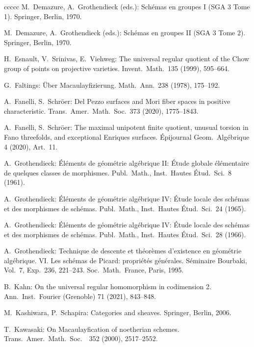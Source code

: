 \documentclass[oneside, 12pt]{amsart}
\theoremstyle{definition}
\theoremstyle{remark}
\begin{document}
\begin{thebibliography}{ccccc}
M.\ Demazure, A.\ Grothendieck (eds.):
Sch\'emas en groupes I (SGA 3 Tome 1).
Springer, Berlin, 1970.

M.\ Demazure, A.\ Grothendieck (eds.):
Sch\'emas en groupes II (SGA 3 Tome 2).
Springer, Berlin, 1970.

H.\ Esnault, V.\ Srinivas, E.\  Viehweg:
The universal regular quotient of the Chow group of points on projective varieties. 
Invent.\ Math.\ 135 (1999), 595--664.

G.\ Faltings:
\"Uber Macaulayfizierung. 
Math.\ Ann.\ 238 (1978),  175--192. 

A.\ Fanelli, S.\ Schr\"oer:
Del Pezzo surfaces and Mori fiber spaces in positive characteristic.
Trans.\ Amer.\ Math.\ Soc.\  373 (2020),  1775--1843.

A.\ Fanelli, S.\ Schr\"oer:
The maximal unipotent finite quotient, unusual torsion in Fano threefolds, and exceptional Enriques surfaces.
\'Epijournal Geom.\ Alg\'ebrique  4 (2020), Art.\ 11.

A.\ Grothendieck:
\'El\'ements de g\'eom\'etrie alg\'ebrique II:
\'Etude globale \'el\'ementaire de quelques classes de morphismes.
Publ.\ Math., Inst.\ Hautes \'Etud.\ Sci.\ 8 (1961).

A.\ Grothendieck:
\'El\'ements de g\'eom\'etrie alg\'ebrique IV: \'Etude locale des
sch\'emas et des morphismes de sch\'emas.
Publ.\ Math., Inst.\ Hautes \'Etud.\ Sci.\   24 (1965).

A.\ Grothendieck:
\'El\'ements de g\'eom\'etrie alg\'ebrique IV: \'Etude locale des
sch\'emas et des morphismes de sch\'emas.
Publ.\ Math., Inst.\ Hautes \'Etud.\ Sci.\  28 (1966).

A.\ Grothendieck:
Technique de descente et th\'eor\`emes d'existence en g\'eom\'etrie alg\'ebrique. VI. 
Les sch\'emas de Picard: propri\'et\'es g\'en\'erales. 
S\'eminaire Bourbaki, Vol.\ 7, Exp.\ 236, 221--243.
Soc.\ Math.\ France, Paris, 1995. 

B.\ Kahn:
On the universal regular homomorphism in codimension 2.  
Ann.\ Inst.\ Fourier (Grenoble) 71 (2021),  843--848. 

M.\ Kashiwara, P.\ Schapira:
Categories and sheaves.
Springer, Berlin, 2006.

T.\ Kawasaki:
On Macaulayfication of noetherian schemes.
Trans.\ Amer.\ Math.\ Soc.\ \ 352 (2000),  2517--2552.


\end{thebibliography}
\end{document}
